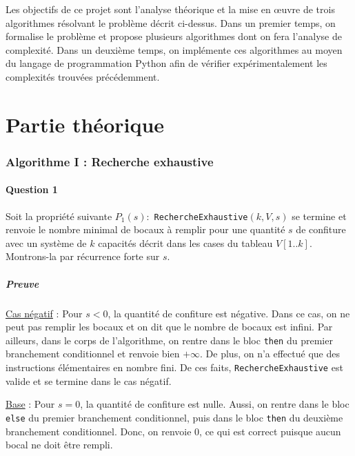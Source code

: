 \documentclass[12pt,a4paper]{article}
\begin{document}
\bigskip
Les objectifs de ce projet sont l'analyse th\'eorique et la mise en \oe uvre de trois algorithmes r\'esolvant le probl\`eme d\'ecrit ci-dessus. Dans un premier temps, on formalise le probl\`eme et propose plusieurs algorithmes dont on fera l'analyse de complexit\'e. Dans un deuxi\`eme temps, on impl\'emente ces algorithmes au moyen du langage de programmation Python afin de v\'erifier exp\'erimentalement les complexit\'es trouv\'ees pr\'ec\'edemment.

\newpage
\part{Partie th\'eorique}

\section{Algorithme I : Recherche exhaustive}

\subsection*{Question 1}
Soit la propri\'et\'e suivante \( P_{1}(s) : \) \texttt{RechercheExhaustive}$(k,V,s)$ se termine et renvoie le nombre minimal de bocaux \`a remplir pour une quantit\'e $s$ de confiture avec un syst\`eme de $k$ capacit\'es d\'ecrit dans les cases du tableau $V[1..k]$.
Montrons-la par r\'ecurrence forte sur $s$.

\subsubsection*{Preuve}
\underline{Cas n\'egatif} : Pour $s < 0$, la quantit\'e de confiture est n\'egative. Dans ce cas, on ne peut pas remplir les bocaux et on dit que le nombre de bocaux est infini. 
Par ailleurs, dans le corps de l'algorithme, on rentre dans le bloc \texttt{then} du premier branchement conditionnel et renvoie bien $+\infty$. De plus, on n'a effectu\'e que des instructions \'el\'ementaires en nombre fini.
De ces faits, \texttt{RechercheExhaustive} est valide et se termine dans le cas n\'egatif.

\medskip
\underline{Base} : Pour \( s = 0\), la quantit\'e de confiture est nulle. Aussi, on rentre dans le bloc \texttt{else} du premier branchement conditionnel, puis dans le bloc \texttt{then} du deuxi\`eme branchement conditionnel. Donc, on renvoie $0$, ce qui est correct puisque aucun bocal ne doit \^etre rempli.
\end{document}
